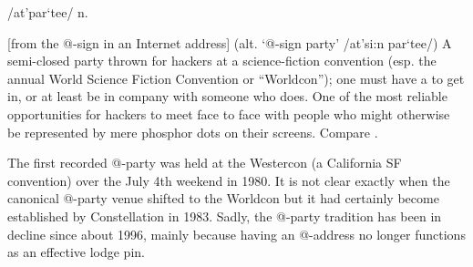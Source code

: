  /at'par`tee/ n.

[from the @-sign in an Internet address] (alt. `@-sign party' /at'si:n
par`tee/) A semi-closed party thrown for hackers at a science-fiction
convention (esp. the annual World Science Fiction Convention or
``Worldcon''); one must have a  to get in, or
at least be in company with someone who does. One of the most reliable
opportunities for hackers to meet face to face with people who might
otherwise be represented by mere phosphor dots on their screens. Compare
.

The first recorded @-party was held at the Westercon (a California SF
convention) over the July 4th weekend in 1980. It is not clear exactly
when the canonical @-party venue shifted to the Worldcon but it had
certainly become established by Constellation in 1983. Sadly, the
@-party tradition has been in decline since about 1996, mainly because
having an @-address no longer functions as an effective lodge pin.

